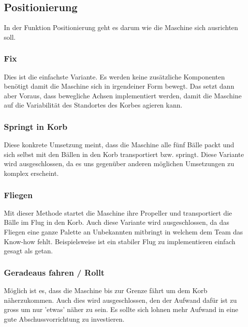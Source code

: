 \subsection{Positionierung}
In der Funktion Positionierung geht es darum wie die Maschine sich ausrichten soll.

\subsubsection{Fix}
Dies ist die einfachste Variante. Es werden keine zusätzliche Komponenten benötigt damit die Maschine sich in irgendeiner Form bewegt. Das setzt dann aber Voraus, dass bewegliche Achsen implementiert werden, damit die Maschine auf die Variabilität des Standortes des Korbes agieren kann.

\subsubsection{Springt in Korb}
Diese konkrete Umsetzung meint, dass die Maschine alle fünf Bälle packt und sich selbst mit den Bällen in den Korb transportiert bzw. springt. Diese Variante wird ausgeschlossen, da es uns gegenüber anderen möglichen Umsetzungen zu komplex erscheint.

\subsubsection{Fliegen}
Mit dieser Methode startet die Maschine ihre Propeller und transportiert die Bälle im Flug in den Korb. Auch diese Variante wird ausgeschlossen, da das Fliegen eine ganze Palette an Unbekannten mitbringt in welchem dem Team das Know-how fehlt. Beispielsweise ist ein stabiler Flug zu implementieren einfach gesagt als getan.

\subsubsection{Geradeaus fahren / Rollt}
Möglich ist es, dass die Maschine bis zur Grenze fährt um dem Korb näherzukommen. Auch dies wird ausgeschlossen, den der Aufwand dafür ist zu gross um nur 'etwas' näher zu sein. Es sollte sich lohnen mehr Aufwand in eine gute Abschussvorrichtung zu investieren. 
